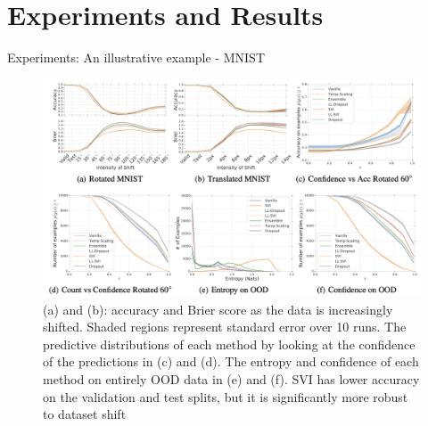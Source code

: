 \documentclass{beamer}
\begin{document}
\section{Experiments and Results}
\begin{frame}{Experiments: An illustrative example - MNIST}
    \begin{figure}{}
        \centering
        \includegraphics[scale=0.24]{images/figure1.png}
        \caption{(a) and (b): accuracy and Brier score as the data is increasingly shifted. Shaded regions represent standard error over 10 runs. %
        The predictive distributions of each method by looking at the confidence of the predictions in (c) and (d).
        The entropy and confidence of each method on entirely OOD data in (e) and (f). SVI has lower accuracy on the validation and test splits, but it is significantly more robust to dataset shift %
        }
        \label{fig:enter-label}
    \end{figure}
\end{frame}
\end{document}
